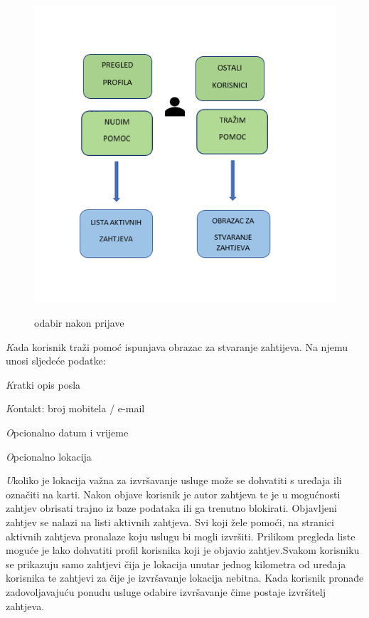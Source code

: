 		\begin{figure}[H]
			\includegraphics[scale=0.6]{slike/projekt1.png} %
			\centering
			\caption \newline odabir nakon prijave
			\label{fig:promjene}
		\end{figure}
		
		\textit Kada korisnik traži pomoć ispunjava obrazac za stvaranje zahtijeva. Na njemu unosi sljedeće podatke:
		
		\begin{packed_item}
			\item \textit Kratki opis posla
			\item \textit Kontakt: broj mobitela / e-mail
			\item \textit Opcionalno datum i vrijeme
			\item \textit Opcionalno lokacija
		\end{packed_item}

        \textit Ukoliko je lokacija važna za izvršavanje usluge može se dohvatiti s uređaja ili označiti na karti.
        \newline
Nakon objave korisnik je autor zahtjeva te je u mogućnosti zahtjev obrisati trajno iz baze podataka ili ga trenutno blokirati. Objavljeni zahtjev se nalazi na listi aktivnih zahtjeva.
\newline
Svi koji žele pomoći, na stranici aktivnih zahtjeva pronalaze koju uslugu bi mogli izvršiti. Prilikom pregleda liste moguće je lako dohvatiti profil korisnika koji je objavio zahtjev.Svakom korisniku se prikazuju samo zahtjevi čija je lokacija unutar jednog kilometra od uređaja korisnika te zahtjevi za čije je izvršavanje lokacija nebitna. Kada korisnik pronađe zadovoljavajuću ponudu usluge odabire izvršavanje čime postaje izvršitelj zahtjeva.

